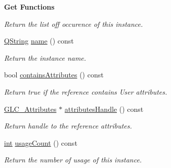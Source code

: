 \begin{Indent}{\bf Get Functions}
\begin{DoxyCompactItemize}
\begin{DoxyCompactList}\small\item\em Return the list off occurence of this instance. \end{DoxyCompactList}\item 
\hyperlink{group___u_a_v_objects_plugin_gab9d252f49c333c94a72f97ce3105a32d}{Q\-String} \hyperlink{class_g_l_c___struct_instance_a675d880ff5a3e5d11cf1dcd41e6441ce}{name} () const 
\begin{DoxyCompactList}\small\item\em Return the instance name. \end{DoxyCompactList}\item 
bool \hyperlink{class_g_l_c___struct_instance_a0cbaf4e2d418b9bf1ac3f8c3906acd27}{contains\-Attributes} () const 
\begin{DoxyCompactList}\small\item\em Return true if the reference contains User attributes. \end{DoxyCompactList}\item 
\hyperlink{class_g_l_c___attributes}{G\-L\-C\-\_\-\-Attributes} $\ast$ \hyperlink{class_g_l_c___struct_instance_a4f2b9d183dcf4ef50ee7784c7bdca419}{attributes\-Handle} () const 
\begin{DoxyCompactList}\small\item\em Return handle to the reference attributes. \end{DoxyCompactList}\item 
\hyperlink{ioapi_8h_a787fa3cf048117ba7123753c1e74fcd6}{int} \hyperlink{class_g_l_c___struct_instance_a9b2b53689c20b1b01dc0367cfa5731a4}{usage\-Count} () const 
\begin{DoxyCompactList}\small\item\em Return the number of usage of this instance. \end{DoxyCompactList}\end{DoxyCompactItemize}
\end{Indent}
